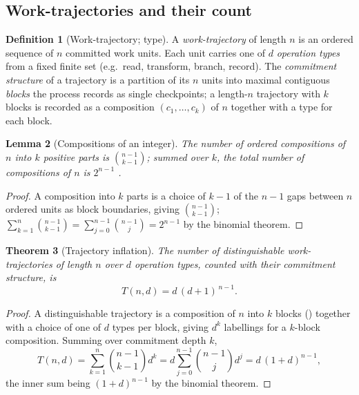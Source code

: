 \documentclass[twocolumn,10pt,a4paper]{article}
\theoremstyle{thmstyle}
\newtheorem{theorem}{Theorem}[section]
\newtheorem{lemma}[theorem]{Lemma}
\theoremstyle{definition}
\newtheorem{definition}[theorem]{Definition}
\theoremstyle{remark}
\begin{document}
\subsection{Work-trajectories and their count}

\begin{definition}[Work-trajectory; type]
\label{def:trajectory}
A \emph{work-trajectory} of length $n$ is an ordered sequence of $n$
committed work units. Each unit carries one of $d$ \emph{operation types}
from a fixed finite set (e.g.\ read, transform, branch, record). The
\emph{commitment structure} of a trajectory is a partition of its $n$
units into maximal contiguous \emph{blocks} the process records as single
checkpoints; a length-$n$ trajectory with $k$ blocks is recorded as a
composition $(c_1,\dots,c_k)$ of $n$ together with a type for each block.
\end{definition}

\begin{lemma}[Compositions of an integer]
\label{lem:compositions}
The number of ordered compositions of $n$ into $k$ positive parts is
$\binom{n-1}{k-1}$; summed over $k$, the total number of compositions of
$n$ is $2^{n-1}$ \citep{stanley2012}.
\end{lemma}

\begin{proof}
A composition into $k$ parts is a choice of $k-1$ of the $n-1$ gaps
between $n$ ordered units as block boundaries, giving $\binom{n-1}{k-1}$;
$\sum_{k=1}^{n}\binom{n-1}{k-1}=\sum_{j=0}^{n-1}\binom{n-1}{j}=2^{n-1}$
by the binomial theorem.
\end{proof}

\begin{theorem}[Trajectory inflation]
\label{thm:inflation}
The number of distinguishable work-trajectories of length $n$ over $d$
operation types, counted with their commitment structure, is
\[
\boxed{\,T(n,d)=d\,(d+1)^{\,n-1}.\,}
\]
\end{theorem}

\begin{proof}
A distinguishable trajectory is a composition of $n$ into $k$ blocks
() together with a choice of one of $d$ types per
block, giving $d^k$ labellings for a $k$-block composition. Summing over
commitment depth $k$,
\[
T(n,d)=\sum_{k=1}^{n}\binom{n-1}{k-1}d^{k}
= d\sum_{j=0}^{n-1}\binom{n-1}{j}d^{j}
= d\,(1+d)^{n-1},
\]
the inner sum being $(1+d)^{n-1}$ by the binomial theorem.
\end{proof}
\end{document}
